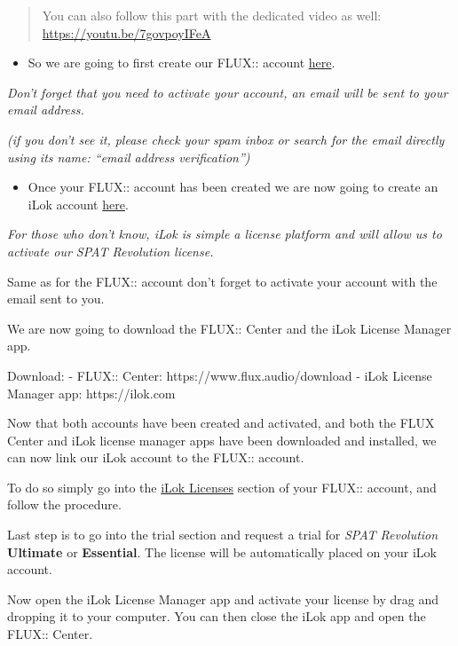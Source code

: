 \documentclass[
  letterpaper,
  DIV=11,
  numbers=noendperiod]{scrreport}
\providecommand{\tightlist}{%
  \setlength{\itemsep}{0pt}\setlength{\parskip}{0pt}}\usepackage{longtable,booktabs,array}
\begin{document}
\begin{quote}
You can also follow this part with the dedicated video as well:
\url{https://youtu.be/7govpoyIFeA}
\end{quote}

\begin{itemize}
\tightlist
\item
  So we are going to first create our FLUX:: account
  \href{https://shop.flux.audio/en_US/register}{here}.
\end{itemize}

\emph{Don't forget that you need to activate your account, an email will
be sent to your email address.}

\emph{(if you don't see it, please check your spam inbox or search for
the email directly using its name: ``email address verification'')}

\begin{itemize}
\tightlist
\item
  Once your FLUX:: account has been created we are now going to create
  an iLok account \href{https://ilok.com/\#!registration}{here}.
\end{itemize}

\emph{For those who don't know, iLok is simple a license platform and
will allow us to activate our SPAT Revolution license.}

Same as for the FLUX:: account don't forget to activate your account
with the email sent to you.

We are now going to download the FLUX:: Center and the iLok License
Manager app.

Download: - FLUX:: Center: https://www.flux.audio/download - iLok
License Manager app: https://ilok.com

Now that both accounts have been created and activated, and both the
FLUX Center and iLok license manager apps have been downloaded and
installed, we can now link our iLok account to the FLUX:: account.

To do so simply go into the
\href{https://shop.flux.audio/en_US/account/trial/request}{iLok
Licenses} section of your FLUX:: account, and follow the procedure.

Last step is to go into the trial section and request a trial for
\emph{SPAT Revolution} \textbf{Ultimate} or \textbf{Essential}. The
license will be automatically placed on your iLok account.

Now open the iLok License Manager app and activate your license by drag
and dropping it to your computer. You can then close the iLok app and
open the FLUX:: Center.
\end{document}

